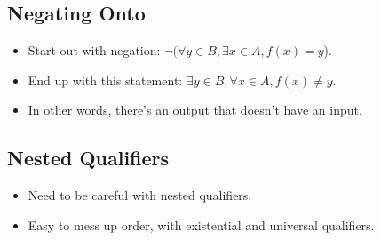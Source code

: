 \subsection{Negating Onto}
\begin{itemize}
    \item Start out with negation: $\neg (\forall y \in B, \exists x \in A, f(x) = y$).
    \item End up with this statement: $\exists y \in B, \forall x \in A, f(x) \neq y$.
    \item In other words, there's an output that doesn't have an input.
\end{itemize}

\subsection{Nested Qualifiers}
\begin{itemize}
    \item Need to be careful with nested qualifiers.
    \item Easy to mess up order, with existential and universal qualifiers.
\end{itemize}